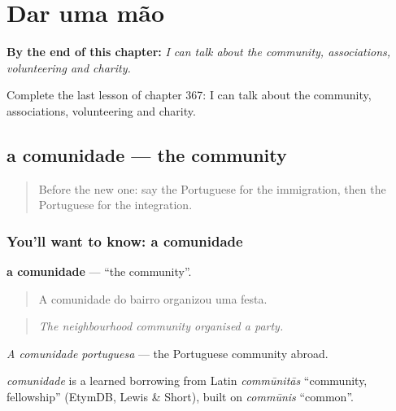 
\chapter{Dar uma mão}
\label{ch:pt-dar-uma-mao}

\begin{chapteropening}
\textbf{By the end of this chapter:} \emph{I can talk about the community, associations, volunteering and charity.}

Complete the last lesson of chapter 367: I can talk about the community, associations, volunteering and charity.
\end{chapteropening}

\section[a comunidade]{a comunidade — the community}

\label{lesson:PT-C367-comunidade}



\begin{quote}
Before the new one: say the Portuguese for the immigration, then the Portuguese for the integration.
\end{quote}

\subsection*{You'll want to know: a comunidade}
\textbf{a comunidade} — \textquotedblleft{}the community\textquotedblright{}.

\begin{quote}
A comunidade do bairro organizou uma festa.
\end{quote}

\begin{quote}
\emph{The neighbourhood community organised a party.}
\end{quote}

\emph{A comunidade portuguesa} — the Portuguese community abroad.

\begin{cousinweb}
\emph{comunidade} is a learned borrowing from Latin \emph{commūnitās} \textquotedblleft{}community, fellowship\textquotedblright{} (EtymDB, Lewis \& Short), built on \emph{commūnis} \textquotedblleft{}common\textquotedblright{}.
\end{cousinweb}

